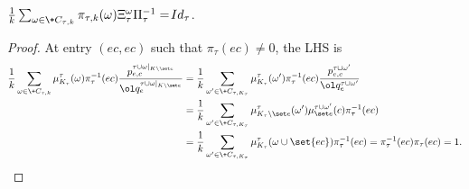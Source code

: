 \begin{lemma}\label{lem:bound-Xi-Pi}
$ \frac{1}{k}\sum_{\omega\in \+C_{\tau, k}}\pi_{\tau, k}(\omega)\Xi^\omega_\tau\Pi^{-1}_\tau = \!{Id}_\tau$.
\end{lemma}
\begin{proof}
    At entry $(ec, ec)$ such that $\pi_\tau(ec)\neq 0$, the LHS is
	\begin{align*}
        \frac{1}{k} \sum_{\omega\in \+C_{\tau, k}}\mu^\tau_{K_\tau}(\omega) \pi^{-1}_\tau(ec)
                      \frac{p^{\tau\cup\omega|_{K\setminus \set e}}_{e, c}}
                       {\ol q^{\tau\cup\omega|_{K\setminus \set e}}_{e   }}
        &= 
        \frac{1}{k} \sum_{\omega'\in \+C_{\tau, K_\tau}}\mu^\tau_{K_\tau}(\omega') \pi^{-1}_\tau(ec)
                      \frac{p^{\tau\cup\omega'}_{e, c}}
                       {\ol q^{\tau\cup\omega'}_{e   }}
      \\&= 
        \frac{1}{k} \sum_{\omega'\in \+C_{\tau, K_\tau}}\mu^\tau_{K_\tau\setminus\set e}(\omega')
                      \mu^{\tau\cup\omega'}_{\set e}(c)
                    \pi^{-1}_\tau(ec)
      \\&= 
        \frac{1}{k} \sum_{\omega'\in \+C_{\tau, K_\tau}}\mu^\tau_{K_\tau}(\omega\cup\set{ec})
                    \pi^{-1}_\tau(ec)
         = 
        \pi^{-1}_\tau(ec) \pi_\tau(ec)
        =1.
	\end{align*}
\end{proof}


